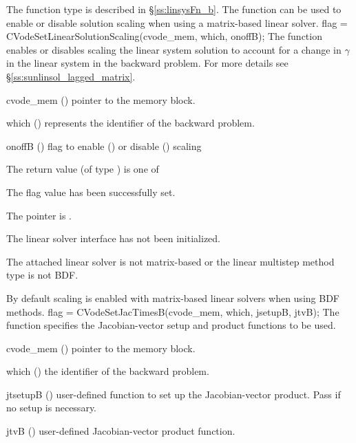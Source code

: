{
  The function type  is described in \S\ref{ss:linsysFn_b}.
}
The function  can be used to enable or
disable solution scaling when using a matrix-based linear solver.
{
  flag = CVodeSetLinearSolutionScaling(cvode\_mem, which, onoffB);
}
{
  The function  enables or disables scaling
  the linear system solution to account for a change in $\gamma$ in the linear
  system in the backward problem. For more details see
  \S\ref{ss:sunlinsol_lagged_matrix}.
}
{
  \begin{args}
  \item[cvode\_mem] ()
    pointer to the {\cvodes} memory block.
  \item[which] ()
    represents the identifier of the backward problem.
  \item[onoffB] ()
    flag to enable () or disable () scaling
  \end{args}
}
{
  The return value  (of type ) is one of
  \begin{args}
  \item[\Id{CVLS\_SUCCESS}]
    The flag value has been successfully set.
  \item[\Id{CVLS\_MEM\_NULL}]
    The  pointer is .
  \item[\Id{CVLS\_LMEM\_NULL}]
    The {\cvls} linear solver interface has not been initialized.
  \item[\Id{CVLS\_ILL\_INPUT}]
    The attached linear solver is not matrix-based or the linear multistep
    method type is not BDF.
  \end{args}
}
{
  By default scaling is enabled with matrix-based linear solvers when using BDF
  methods.
}
{
  flag = CVodeSetJacTimesB(cvode\_mem, which, jsetupB, jtvB);
}
{
  The function  specifies the Jacobian-vector
  setup and product functions to be used.
}
{
  \begin{args}
  \item[cvode\_mem] ()
    pointer to the {\cvodes} memory block.
  \item[which] ()
    the identifier of the backward problem.
  \item[jtsetupB] ()
    user-defined function to set up the Jacobian-vector product.
    Pass  if no setup is necessary.
  \item[jtvB] ()
    user-defined Jacobian-vector product function.
  \end{args}
}
